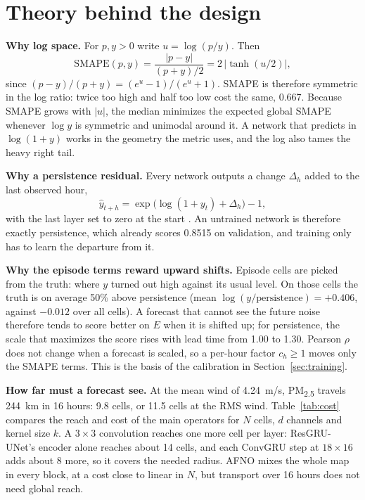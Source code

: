\documentclass[conference]{IEEEtran}
\newcommand{\PM}{PM\textsubscript{2.5}}
\begin{document}
\section{Theory behind the design}
\label{sec:theory}
\textbf{Why log space.} For $p,y>0$ write $u=\log(p/y)$. Then
\begin{equation}
\mathrm{SMAPE}(p,y) = \frac{|p-y|}{(p+y)/2} = 2\,\bigl|\tanh(u/2)\bigr|,
\end{equation}
since $(p-y)/(p+y)=(e^u-1)/(e^u+1)$. SMAPE is therefore symmetric in the log ratio: twice too high and half too low cost the same, 0.667. Because SMAPE grows with $|u|$, the median minimizes the expected global SMAPE whenever $\log y$ is symmetric and unimodal around it. A network that predicts in $\log(1+y)$ works in the geometry the metric uses, and the log also tames the heavy right tail.

\textbf{Why a persistence residual.} Every network outputs a change $\Delta_h$ added to the last observed hour,
\begin{equation}
\hat{y}_{t+h} = \exp\bigl(\log(1+y_t) + \Delta_h\bigr) - 1,
\end{equation}
with the last layer set to zero at the start \cite{he2016}. An untrained network is therefore exactly persistence, which already scores 0.8515 on validation, and training only has to learn the departure from it.

\textbf{Why the episode terms reward upward shifts.} Episode cells are picked from the truth: where $y$ turned out high against its usual level. On those cells the truth is on average 50\% above persistence (mean $\log(y/\text{persistence})=+0.406$, against $-0.012$ over all cells). A forecast that cannot see the future noise therefore tends to score better on $E$ when it is shifted up; for persistence, the scale that maximizes the score rises with lead time from 1.00 to 1.30. Pearson $\rho$ does not change when a forecast is scaled, so a per-hour factor $c_h\ge1$ moves only the SMAPE terms. This is the basis of the calibration in Section~\ref{sec:training}.

\textbf{How far must a forecast see.} At the mean wind of 4.24~m/s, \PM{} travels 244~km in 16 hours: 9.8 cells, or 11.5 cells at the RMS wind. Table~\ref{tab:cost} compares the reach and cost of the main operators for $N$ cells, $d$ channels and kernel size $k$. A $3\times3$ convolution reaches one more cell per layer: ResGRU-UNet's encoder alone reaches about 14 cells, and each ConvGRU step at $18\times16$ adds about 8 more, so it covers the needed radius. AFNO mixes the whole map in every block, at a cost close to linear in $N$, but transport over 16 hours does not need global reach.
\end{document}

